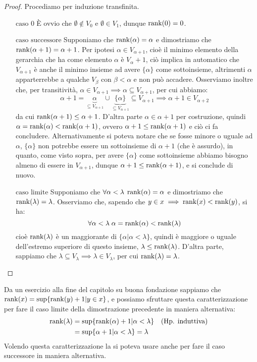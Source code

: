\begin{proof}
	Procediamo per induzione transfinita.
	\begin{itemize}
		\item[$\boxed{\text{caso 0}}$] È ovvio che $\emptyset \not \in V_0$ e $\emptyset \in V_1$, dunque $\operatorname{rank}(0) = 0$.
		\item[$\boxed{\text{caso successore}}$] Supponiamo che $\operatorname{rank}(\alpha) = \alpha$ e dimostriamo che $\operatorname{rank}(\alpha + 1) = \alpha + 1$. Per ipotesi $\alpha \in V_{\alpha + 1}$, cioè il minimo elemento della gerarchia che ha come elemento $\alpha$ è $V_\alpha + 1$,
		ciò implica in automatico che $V_{\alpha + 1}$ è anche il minimo insieme ad avere $\{\alpha\}$ come sottoinsieme, altrimenti $\alpha$ apparterrebbe a qualche $V_\beta$ con $\beta < \alpha$ e non può accadere. Osserviamo inoltre che, per transitività, $\alpha \in V_{\alpha + 1} \implies \alpha \subseteq V_{\alpha + 1}$, per cui abbiamo:
		\[ \alpha + 1 = \underbrace{\alpha}_{\subseteq V_{\alpha + 1}} \cup \underbrace{\{\alpha\}}_{\subseteq V_{\alpha + 1}} \subseteq V_{\alpha + 1} \implies \alpha + 1 \in V_{\alpha + 2}
			\]
		da cui $\operatorname{rank}(\alpha + 1) \leq \alpha + 1$. D'altra parte $\alpha \in \alpha + 1$ per costruzione, quindi $\alpha = \operatorname{rank}(\alpha) < \operatorname{rank}(\alpha + 1)$, ovvero $\alpha + 1 \leq \operatorname{rank}(\alpha + 1)$ e ciò ci fa concludere. Alternativamente si poteva notare che se fosse minore o uguale ad $\alpha$, $\{\alpha\}$
		non potrebbe essere un sottoinsieme di $\alpha + 1$ (che è assurdo), in quanto, come visto sopra, per avere $\{\alpha\}$ come sottoinsieme abbiamo bisogno almeno di essere in $V_{\alpha + 1}$, dunque $\alpha + 1 \leq \operatorname{rank}(\alpha + 1)$, e si conclude di nuovo. 
		\item[$\boxed{\text{caso limite}}$] Supponiamo che $\forall \alpha < \lambda \; \operatorname{rank}(\alpha) = \alpha$ e dimostriamo che $\operatorname{rank}(\lambda) = \lambda$. Osserviamo che, sapendo che $y \in x \implies \operatorname{rank}(x) < \operatorname{rank}(y)$, si ha:
		\[ \forall \alpha < \lambda \; \alpha = \operatorname{rank}(\alpha) < \operatorname{rank}(\lambda)
			\]
		cioè $\operatorname{rank}(\lambda)$ è un maggiorante di $\{\alpha | \alpha < \lambda\}$, quindi è maggiore o uguale dell'estremo superiore di questo insieme, $\lambda \leq \operatorname{rank}(\lambda)$. D'altra parte, sappiamo che $\lambda \subseteq V_{\lambda} \implies \lambda \in V_\lambda$, per cui $\operatorname{rank}(\lambda) = \lambda$.
	\end{itemize}
\end{proof}

\begin{remark}
	Da un esercizio alla fine del capitolo su buona fondazione sappiamo che $\operatorname{rank}(x) = \sup\{\operatorname{rank}(y) + 1 | y \in x\}$, e possiamo sfruttare questa caratterizzazione per fare il caso limite della dimostrazione precedente in maniera alternativa:
	\begin{align*}
		\operatorname{rank}(\lambda) &= \sup\{\operatorname{rank}(\alpha) + 1 | \alpha < \lambda\} &&\text{(Hp. induttiva)}\\
					   &= \sup\{\alpha + 1 | \alpha < \lambda\} = \lambda
	\end{align*}
	Volendo questa caratterizzazione la si poteva usare anche per fare il caso successore in maniera alternativa.
\end{remark}

